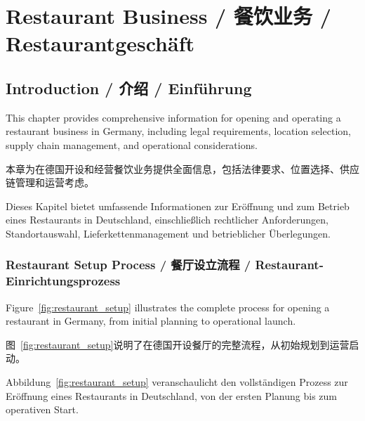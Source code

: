 \chapter{Restaurant Business / 餐饮业务 / Restaurantgeschäft}

\section{Introduction / 介绍 / Einführung}

This chapter provides comprehensive information for opening and operating a restaurant business in Germany, including legal requirements, location selection, supply chain management, and operational considerations.

本章为在德国开设和经营餐饮业务提供全面信息，包括法律要求、位置选择、供应链管理和运营考虑。

Dieses Kapitel bietet umfassende Informationen zur Eröffnung und zum Betrieb eines Restaurants in Deutschland, einschließlich rechtlicher Anforderungen, Standortauswahl, Lieferkettenmanagement und betrieblicher Überlegungen.

\subsection{Restaurant Setup Process / 餐厅设立流程 / Restaurant-Einrichtungsprozess}

Figure~\ref{fig:restaurant_setup} illustrates the complete process for opening a restaurant in Germany, from initial planning to operational launch.

图~\ref{fig:restaurant_setup}说明了在德国开设餐厅的完整流程，从初始规划到运营启动。

Abbildung~\ref{fig:restaurant_setup} veranschaulicht den vollständigen Prozess zur Eröffnung eines Restaurants in Deutschland, von der ersten Planung bis zum operativen Start.

